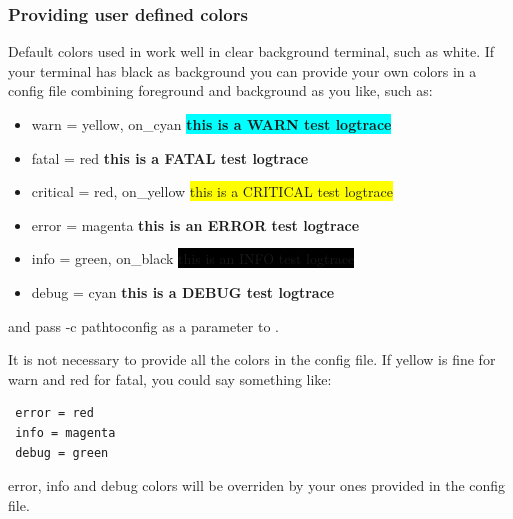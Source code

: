 \subsubsection{Providing user defined colors}
Default colors used in \logftailer{} work well in clear background terminal,
such as white. If your terminal has black as background you can provide your own
colors in a config file combining foreground and background as you like, such as:
\begin{itemize}
 \item warn = yellow, on\_cyan \colorbox{cyan}{\color{yellow}\textbf{this is a WARN test logtrace}}
 \item fatal = red {\color{red}\textbf{this is a FATAL test logtrace}}
 \item critical = red, on\_yellow \colorbox{yellow}{\color{red}this is a CRITICAL test logtrace}
 \item error = magenta {\color{magenta}\textbf{this is an ERROR test logtrace}}
 \item info = green, on\_black \colorbox{black}{\color{green}this is an INFO test logtrace}
 \item debug = cyan {\color{cyan}\textbf{this is a DEBUG test logtrace}}
\end{itemize}
and pass -c pathtoconfig as a parameter to \logftailer{}. 

It is not necessary to 
provide all the colors in the config file. If yellow is fine for warn and red for 
fatal, you could say something like:
\begin{verbatim}
 error = red
 info = magenta
 debug = green
\end{verbatim}
error, info and debug colors will be overriden by your ones provided in the config 
file. 

